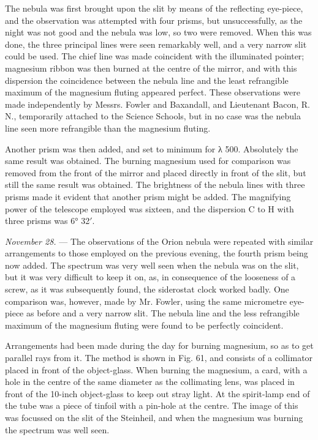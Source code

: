 \documentclass[a4paper, 12pt, oneside, polutonikogreek, english]{article}
\begin{document}
The nebula was first brought upon the slit by means of the reflecting eye-piece, and the observation was attempted with four prisms, but unsuccessfully, as the night was not good and the nebula was low, so two were removed. When this was done, the three principal lines were seen remarkably well, and a very narrow slit could be used. The chief line was made coincident with the illuminated pointer; magnesium ribbon was then burned at the centre of the mirror, and with this dispersion the coincidence between the nebula line and the least refrangible maximum of the magnesium fluting appeared perfect. These observations were made independently by Messrs. Fowler and Baxandall, and Lieutenant Bacon, R. N., temporarily attached to the Science Schools, but in no case was the nebula line seen more refrangible than the magnesium fluting.

Another prism was then added, and set to minimum for λ 500. Absolutely the same result was obtained. The burning magnesium used for comparison was removed from the front of the mirror and placed directly in front of the slit, but still the same result was obtained. The brightness of the nebula lines with three prisms made it evident that another prism might be added. The magnifying power of the telescope employed was sixteen, and the dispersion C to H with three prisms was 6° 32$\prime$.

\emph{November 28.} --- The observations of the Orion nebula were repeated with similar arrangements to those employed on the previous evening, the fourth prism being now added. The spectrum was very well seen when the nebula was on the slit, but it was very difficult to keep it on, as, in consequence of the looseness of a screw, as it was subsequently found, the siderostat clock worked badly. One comparison was, however, made by Mr. Fowler, using the same micrometre eye-piece as before and a very narrow slit. The nebula line and the less refrangible maximum of the magnesium fluting were found to be perfectly coincident.

Arrangements had been made during the day for burning magnesium, so as to get parallel rays from it. The method is shown in Fig. 61, and consists of a collimator placed in front of the object-glass. When burning the magnesium, a card, with a hole in the centre of the same diameter as the collimating lens, was placed in front of the 10-inch object-glass to keep out stray light. At the spirit-lamp end of the tube was a piece of tinfoil with a pin-hole at the centre. The image of this was focussed on the slit of the Steinheil, and when the magnesium was burning the spectrum was well seen.
\end{document}
